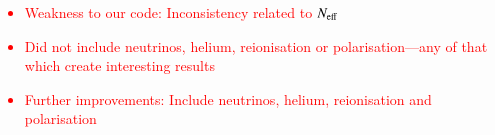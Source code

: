 


\textcolor{red}{
\begin{itemize}
    \item Weakness to our code: Inconsistency related to $N_\mathrm{eff}$
    \item Did not include neutrinos, helium, reionisation or polarisation---any of that which create interesting results
    \item Further improvements: Include neutrinos, helium, reionisation and polarisation
\end{itemize}
}